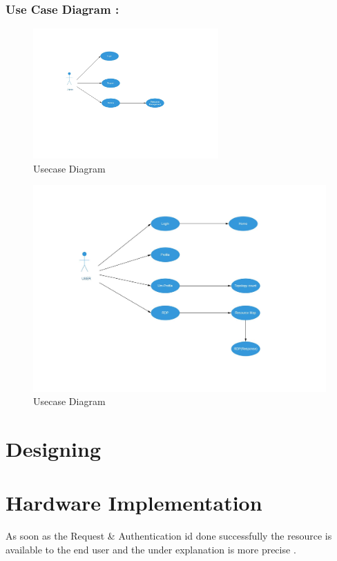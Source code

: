 \documentclass[12pt,a4paper,final,oneside]{report}
\begin{document}
	\subsubsection{Use Case Diagram :}
\begin{figure}
\centering
\includegraphics[height=5cm]{use1.jpg}
\caption{Usecase Diagram}
\end{figure}
\begin{figure}
		\centering	\includegraphics[width=1.0\linewidth,angle=0]
		{use2.jpg}
		\caption{Usecase Diagram}
	\end{figure}
	\newpage
\section{Designing }
\section{Hardware Implementation}
As soon as the Request \& Authentication id done successfully the resource is available to the end user and the under explanation is more precise . 
\end{document}
